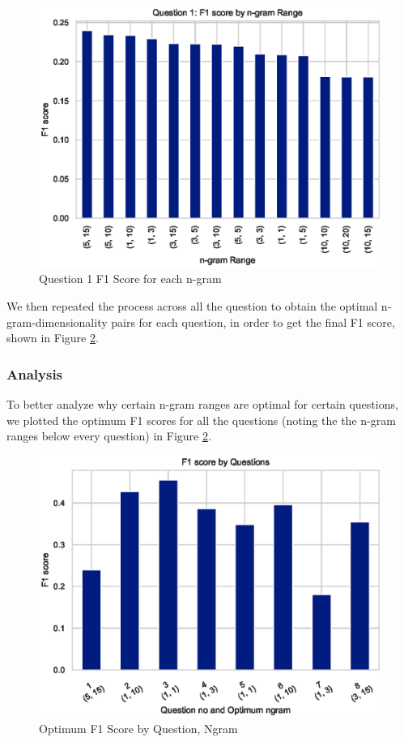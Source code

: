\documentclass[10pt,letterpaper]{article}
\begin{document}
\begin{figure}[ht]
\begin{center}
\includegraphics[width=\linewidth]{img/Q1F1ByNgrams.eps}
\end{center}
\caption{Question 1 F1 Score for each n-gram}
\label{Q1F1ByNgrams}
\end{figure}

We then repeated the process across all the question to obtain the optimal n-gram-dimensionality pairs for each question, in order to get the final F1 score, shown in Figure \ref{F1ByQuestions}.


\subsubsection{Analysis}
To better analyze why certain n-gram ranges are optimal for certain questions, we plotted the optimum F1 scores for all the questions (noting the the n-gram ranges below every question) in Figure \ref{F1ByQuestions}.

\begin{figure}[ht]
\begin{center}
\includegraphics[width=\linewidth]{img/F1ByQuestions.eps}
\end{center}
\caption{Optimum F1 Score by Question, Ngram}
\label{F1ByQuestions}
\end{figure}
\end{document}
